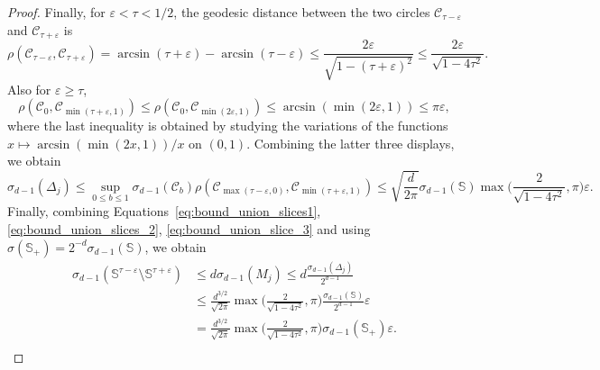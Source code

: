 \documentclass{article}
\numberwithin{equation}{section}
\newcommand{\sphere}{\mathbb{S}}
\begin{document}
\begin{proof}
      Finally, for $\varepsilon<\tau <1/2$, the geodesic distance between the two circles $\mathcal{C}_{\tau- \varepsilon }$ and $\mathcal{C}_{\tau+\varepsilon }$ is
      $$
      \rho(\mathcal{C}_{\tau-\varepsilon }, \mathcal{C}_{\tau+\varepsilon }) =
      \arcsin(\tau+\varepsilon ) - \arcsin(\tau-\varepsilon ) \le
      \frac{2 \varepsilon }{\sqrt{1 - (\tau+\varepsilon )^2}} \le 
      \frac{2 \varepsilon }{\sqrt{1 - 4\tau^2}}.
      $$
      Also for $\varepsilon\ge \tau$, 
$$
      \rho(\mathcal{C}_{0}, \mathcal{C}_{\min(\tau+\varepsilon,1) }) \le 
      \rho(\mathcal{C}_{0}, \mathcal{C}_{\min(2\varepsilon,1) }) \le 
      \arcsin(\min(2\varepsilon,1)) \le \pi\varepsilon,
      $$
      where the last inequality is obtained by studying the variations of the functions $x\mapsto \arcsin(\min(2x,1))/x$ on $(0,1)$. 
      Combining the latter  three displays, we obtain 
      \begin{equation}\label{eq:bound_union_slice_3}
      \sigma_{d-1}(\Delta_j) \le \sup_{0\le b\le 1}\sigma_{d-1}(\mathcal{C}_b)\rho(\mathcal{C}_{\max(\tau-\varepsilon,0) }, \mathcal{C}_{\min(\tau+\varepsilon,1) }) 
      \le \sqrt{\frac{d}{2\pi}} \sigma_{d-1}(\sphere)
      \max\Big(\frac{2 }{\sqrt{1 - 4\tau^2}}, 
       {\pi}\Big)\varepsilon.
      \end{equation}
      Finally,  combining Equations~\eqref{eq:bound_union_slices1}, \eqref{eq:bound_union_slices_2}, \eqref{eq:bound_union_slice_3} and using $\sigma(\sphere_+) = 2^{-d}\sigma_{d-1}(\sphere)$, we obtain
      \begin{align*}
      \sigma_{d-1}(\sphere^{\tau-\varepsilon}\setminus\sphere^{\tau+\varepsilon}) 
      & \le 
      d \sigma_{d-1}(M_j) \le d \frac{\sigma_{d-1}(\Delta_j)}{2^{d-1}}\\
      &\le \frac{d^{3/2}}{\sqrt{2\pi}}
      \max\Big(\frac{2 }{\sqrt{1 - 4\tau^2}}, 
       \pi %
       \Big)
      \frac{\sigma_{d-1}(\sphere)}{2^{d-1}} \varepsilon\\
      &=\frac{d^{3/2}}{\sqrt{2\pi}}
      \max\Big(\frac{2 }{\sqrt{1 - 4\tau^2}}, 
       \pi%
       \Big)
      \sigma_{d-1}(\sphere_+) \varepsilon.\\

\end{align*}
\end{proof}
\end{document}
